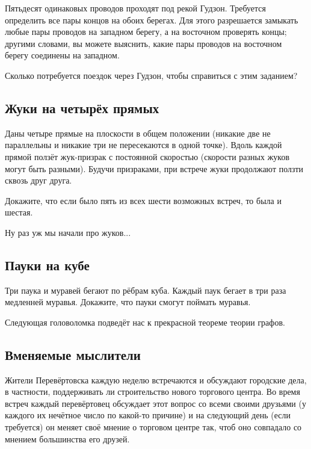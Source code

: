 Пятьдесят одинаковых проводов проходят под рекой Гудзон.
Требуется определить все пары концов на обоих берегах.
Для этого разрешается замыкать любые пары проводов на западном берегу, а на восточном проверять концы;
другими словами, вы можете выяснить, какие пары проводов на восточном берегу соединены на западном.

Сколько потребуется поездок через Гудзон, чтобы справиться с этим заданием?

\subsection*{Жуки на четырёх прямых}

Даны четыре прямые на плоскости в общем положении (никакие две не параллельны и никакие три не пересекаются в одной точке).
Вдоль каждой прямой ползёт жук-призрак с постоянной скоростью (скорости разных жуков могут быть разными).
Будучи призраками, при встрече жуки продолжают ползти сквозь друг друга.

Докажите, что если было пять из всех шести возможных встреч,
то была и шестая.

\medskip

Ну раз уж мы начали про жуков...

\subsection*{Пауки на кубе}

Три паука и муравей бегают по рёбрам куба.
Каждый паук бегает в три раза медленней муравья.
Докажите, что пауки смогут поймать муравья.

\medskip

Следующая головоломка подведёт нас к прекрасной теореме теории графов.

\subsection*{Вменяемые мыслители}\label{Вменяемые мыслители}

Жители Перевёртовска каждую неделю встречаются и обсуждают городские дела, в частности, поддерживать ли строительство нового торгового центра.
Во время встреч каждый перевёртовец обсуждает этот вопрос со всеми своими друзьями (у каждого их нечётное число по какой-то причине) и на следующий день (если требуется) он меняет своё мнение о торговом центре так, чтоб оно совпадало со мнением большинства его друзей.

